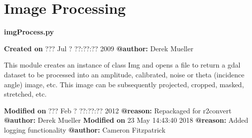 \documentclass[letterpaper,10pt,openany,oneside]{sphinxmanual}
\begin{document}
\section{Image Processing}
\label{code:image-processing}\label{code:module-Image}
\textbf{imgProcess.py}

\textbf{Created on} ??? Jul  ? ??:??:?? 2009 \textbf{@author:} Derek Mueller

This module creates an instance of class Img and opens a file to return a
gdal dataset to be processed into an amplitude, calibrated, noise or theta
(incidence angle) image, etc. This image can be subsequently projected,
cropped, masked, stretched, etc.

\textbf{Modified on} ??? Feb  ? ??:??:?? 2012 \textbf{@reason:} Repackaged for r2convert \textbf{@author:} Derek Mueller
\textbf{Modified on} 23 May 14:43:40 2018 \textbf{@reason:} Added logging functionality \textbf{@author:} Cameron Fitzpatrick
\end{document}
